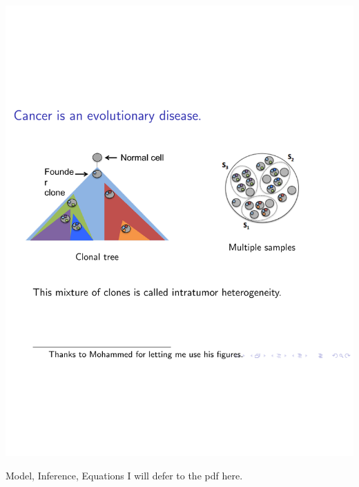 \documentclass{beamer}
\begin{document}
\begin{frame}
\vspace*{-3.5cm}
\hspace*{-1.17cm}
\includegraphics[page=5, width=\paperwidth]{DDL-UTRA-2016-intro.pdf}
\end{frame}

\begin{frame}{Model, Inference, Equations}
I will defer to the pdf here.
\end{frame}
\end{document}
